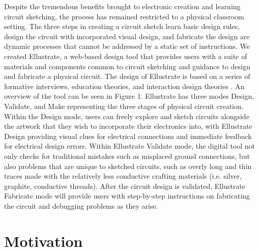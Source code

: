 \documentclass{sigchi}
\begin{document}
Despite the tremendous benefits brought to electronic creation and learning circuit sketching, the process has remained restricted to a physical classroom setting. 
The three steps in creating a circuit sketch \textendash learn basic design rules, design the circuit with incorporated visual design, and fabricate the design \textendash are dynamic processes that cannot be addressed by a static set of instructions. 
We created Ellustrate, a web-based design tool that provides users with a suite of materials and components common to circuit sketching and guidance to design and fabricate a physical circuit. 
The design of Ellustrate is based on a series of formative interviews, education theories, and interaction design theories .
An overview of the tool can be seen in Figure 1. Ellustrate has three modes \textendash Design, Validate, and Make \textendash representing the three stages of physical circuit creation.
Within the Design mode, users can freely explore and sketch circuits alongside the artwork that they wish to incorporate their electronics into, with Ellustrate Design providing visual clues for electrical connections and immediate feedback for electrical design errors.
Within Ellustrate Validate mode, the digital tool not only checks for traditional mistakes such as misplaced ground connections, but also problems that are unique to sketched circuits, such as overly long and thin traces made with the relatively less conductive crafting materials (i.e. silver, graphite, conductive threads). After the circuit design is validated, Ellustrate Fabricate mode will provide users with step-by-step instructions on fabricating the circuit and debugging problems as they arise. 

\section{Motivation}
\end{document}
